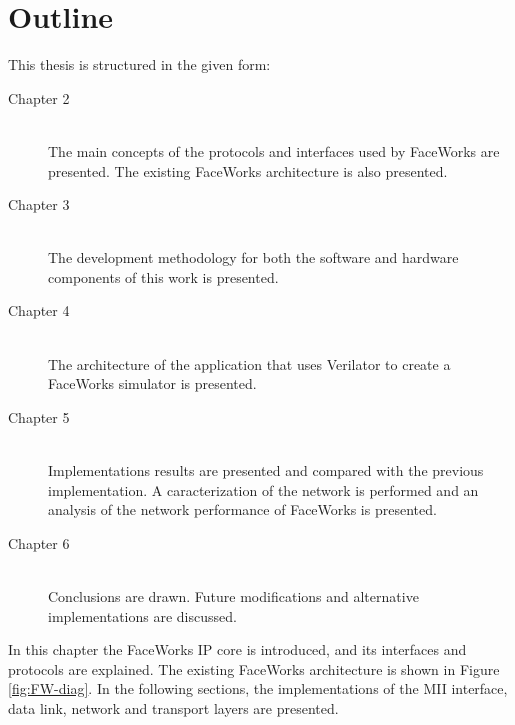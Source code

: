 \documentclass[defaultstyle,10pt,master,Helvetica]{thesis}
\begin{document}
\section{Outline}
This thesis is structured in the given form:
\begin{description}
\item[Chapter 2] \hfill \\ The main concepts of the protocols and interfaces used by FaceWorks are presented. The existing FaceWorks architecture is also presented.
\item[Chapter 3] \hfill \\ The development methodology for both the software and hardware components of this work is presented.
\item[Chapter 4] \hfill \\ The architecture of the application that uses Verilator to create a FaceWorks simulator is presented.
\item[Chapter 5] \hfill \\ Implementations results are presented and compared with the previous implementation. A caracterization of the network is performed and an analysis of the network performance of FaceWorks is presented.
\item[Chapter 6] \hfill \\ Conclusions are drawn. Future modifications and alternative implementations are discussed.

\end{description}
\cleardoublepage


In this chapter the FaceWorks IP core is introduced, and its interfaces and protocols are explained. The existing FaceWorks architecture is shown in Figure \ref{fig:FW-diag}. In the following sections, the implementations of the \ac{MII} interface, data link, network and transport layers are presented.
\end{document}
